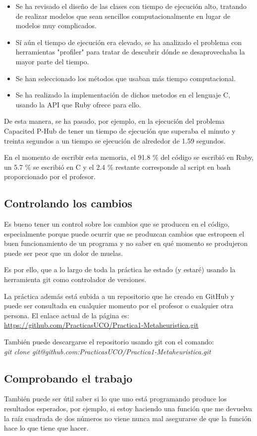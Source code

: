 \documentclass[12pt,a4paper,draft,openany]{article}
\begin{document}
\begin{itemize}
\item Se ha revisado el diseño de las clases con tiempo de ejecución alto, tratando de realizar modelos que sean sencillos computacionalmente en lugar de modelos muy complicados.
\item Sí aún el tiempo de ejecución era elevado, se ha analizado el problema con herramientas
"profiler" para tratar de descubrir dónde se desaprovechaba la mayor parte del tiempo.
\item Se han seleccionado los métodos que usaban más tiempo computacional.
\item Se ha realizado la implementación de dichos metodos en el lenguaje C, usando la
API que Ruby ofrece para ello.
\end{itemize}

De esta manera, se ha pasado, por ejemplo, en la ejecución del problema Capacited P-Hub de tener un tiempo de ejecución que superaba el minuto y treinta segundos a un tiempo se ejecución de alrededor de 1.59 segundos.

En el momento de escribir esta memoria, el 91.8 \% del código se escribió en Ruby, un 5.7 \% se escribió en C y el 2.4 \% restante corresponde al script en bash proporcionado por el profesor.

\subsection{Controlando los cambios}
Es bueno tener un control sobre los cambios que se producen en el código, especialmente porque puede ocurrir que se produzcan cambios que estropeen el buen funcionamiento de un programa y no saber en qué momento se produjeron puede ser peor que un dolor de muelas.

Es por ello, que a lo largo de toda la práctica he estado (y estaré) usando la herramienta
git como controlador de versiones.

La práctica además está subida a un repositorio que he creado en GitHub y puede ser consultada en cualquier momento por el profesor o cualquier otra persona. El enlace actual de la página es: \url{https://github.com/PracticasUCO/Practica1-Metaheuristica.git}

También puede descargarse el repositorio usando git con el comando: \\
\emph{git clone git@github.com:PracticasUCO/Practica1-Metaheuristica.git}

\subsection{Comprobando el trabajo}
También puede ser útil saber si lo que uno está programando produce los resultados esperados, por ejemplo, si estoy haciendo una función que me devuelva la raíz cuadrada de dos números no viene nunca mal asegurarse de que la función hace lo que tiene que hacer.
\end{document}
